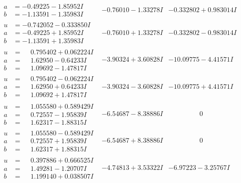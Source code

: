 \documentclass[1p]{elsarticle_modified}
\theoremstyle{definition}
\begin{document}
$$\begin{array}{c|c|c}
\begin{aligned}
a &= -0.49225 - 1.85952 I \\
b &= -1.13591 - 1.35983 I\end{aligned}
 & -0.76010 - 1.33278 I & -0.332802 + 0.983014 I \\ \hline\begin{aligned}
u &= -0.742052 - 0.333850 I \\
a &= -0.49225 + 1.85952 I \\
b &= -1.13591 + 1.35983 I\end{aligned}
 & -0.76010 + 1.33278 I & -0.332802 - 0.983014 I \\ \hline\begin{aligned}
u &= \phantom{-}0.795402 + 0.062224 I \\
a &= \phantom{-}1.62950 - 0.64233 I \\
b &= \phantom{-}1.09692 - 1.47817 I\end{aligned}
 & -3.90324 + 3.60828 I & -10.09775 - 4.41571 I \\ \hline\begin{aligned}
u &= \phantom{-}0.795402 - 0.062224 I \\
a &= \phantom{-}1.62950 + 0.64233 I \\
b &= \phantom{-}1.09692 + 1.47817 I\end{aligned}
 & -3.90324 - 3.60828 I & -10.09775 + 4.41571 I \\ \hline\begin{aligned}
u &= \phantom{-}1.055580 + 0.589429 I \\
a &= \phantom{-}0.72557 - 1.95839 I \\
b &= \phantom{-}1.62317 - 1.88315 I\end{aligned}
 & -6.54687 - 8.38886 I & \phantom{-0.000000 } 0 \\ \hline\begin{aligned}
u &= \phantom{-}1.055580 - 0.589429 I \\
a &= \phantom{-}0.72557 + 1.95839 I \\
b &= \phantom{-}1.62317 + 1.88315 I\end{aligned}
 & -6.54687 + 8.38886 I & \phantom{-0.000000 } 0 \\ \hline\begin{aligned}
u &= \phantom{-}0.397886 + 0.666525 I \\
a &= \phantom{-}1.49281 - 1.20707 I \\
b &= \phantom{-}1.199140 + 0.038507 I\end{aligned}
 & -4.74813 + 3.53322 I & -6.97223 - 3.25767 I\\

\end{array}$$
\end{document}
